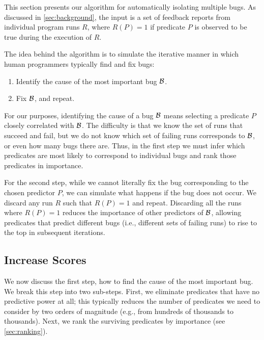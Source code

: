 This section presents our algorithm for automatically isolating
multiple bugs.  As discussed in \autoref{sec:background}, the input is
a set of feedback reports from individual program runs $R$, where
$R(P) = 1$ if predicate $P$ is observed to be true during the
execution of $R$.

The idea behind the algorithm is to simulate the iterative manner in which  human programmers
typically find and fix bugs:
\begin{enumerate}

\item Identify the cause of the most important bug ${\cal B}$.

\item Fix ${\cal B}$, and repeat.

\end{enumerate}

For our purposes, identifying the cause of a bug ${\cal B}$ means selecting a
predicate $P$ closely correlated with ${\cal B}$.  The difficulty is that we
know the set of runs that succeed and fail, but we do not know which
set of failing runs corresponds to ${\cal B}$, or even how many bugs there
are.  Thus, in the first step we must infer which predicates are most
likely to correspond to individual bugs and rank those predicates in
importance.

For the second step, while we cannot literally fix the bug
corresponding to the chosen predictor $P$, we can simulate what
happens if the bug does not occur.  We discard any run $R$ such that
$R(P) = 1$ and repeat.  Discarding all the runs where $R(P) = 1$
reduces the importance of other predictors of ${\cal B}$, allowing predicates
that predict different bugs (i.e., different sets of failing runs) to
rise to the top in subsequent iterations.

\subsection{Increase Scores}
\label{sec:increase}

We now discuss the first step, how to find the cause of the most important bug.
We break this step into two sub-steps.  First, we eliminate predicates that have no
predictive power at all; this typically reduces the number of predicates we need
to consider by two orders of magnitude (e.g., from hundreds of thousands to thousands).
Next, we rank the surviving predicates by importance (see \autoref{sec:ranking}).

